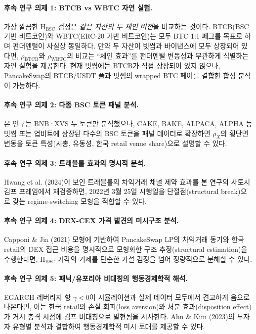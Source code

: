 \documentclass[11pt,a4paper]{article}
\begin{document}
\paragraph{후속 연구 의제 1: BTCB vs WBTC 자연 실험.}
가장 깔끔한 H$_{\text{BSC}}$ 검정은 \emph{같은 자산의 두 체인 버전}을 비교하는 것이다.
BTCB(BSC 기반 비트코인)와 WBTC(ERC-20 기반 비트코인)는 모두 BTC 1:1 페그를 목표로 하며
펀더멘털이 사실상 동일하다. 만약 두 자산이 빗썸과 바이낸스에 모두 상장되어 있다면,
$\rho_{\text{BTCB}}$와 $\rho_{\text{WBTC}}$의 비교는 ``체인 효과''를 펀더멘털 변동성과 무관하게
식별하는 자연 실험을 제공한다. 현재 빗썸에는 BTCB가 직접 상장되어 있지 않으나,
PancakeSwap의 BTCB/USDT 풀과 빗썸의 wrapped BTC 페어를 결합한 합성 분석이 가능하다.

\paragraph{후속 연구 의제 2: 다종 BSC 토큰 패널 분석.}
본 연구는 BNB·XVS 두 토큰만 분석했으나, CAKE, BAKE, ALPACA, ALPHA 등 빗썸 또는 업비트에 상장된
다수의 BSC 토큰을 패널 데이터로 확장하면 $\rho_X$의 횡단면 변동을 토큰 특성(시총, 유동성,
한국 retail venue share)으로 설명할 수 있다.

\paragraph{후속 연구 의제 3: 트래블룰 효과의 명시적 분석.}
Hwang et al. (2024)이 보인 트래블룰의 차익거래 채널 제약 효과를 본 연구의 사토시 김프
프레임에서 재검증하면, 2022년 3월 25일 시행일을 단절점(structural break)으로 갖는
regime-switching 모형을 적합할 수 있다.

\paragraph{후속 연구 의제 4: DEX-CEX 가격 발견의 미시구조 분석.}
Capponi \& Jia (2021) 모형에 기반하여 PancakeSwap LP의 차익거래 동기와 한국 retail의
DEX 접근 비용을 명시적으로 모형화한 구조 추정(structural estimation)을 수행한다면,
H$_{\text{BSC}}$ 기각의 기제를 단순한 가설 검정을 넘어 정량적으로 분해할 수 있다.

\paragraph{후속 연구 의제 5: 패닉/유포리아 비대칭의 행동경제학적 해석.}
EGARCH 레버리지 항 $\gamma<0$이 시뮬레이션과 실제 데이터 모두에서 견고하게 음으로 나온다면,
이는 한국 retail의 손실 회피(loss aversion)와 처분 효과(disposition effect)가 거시 충격 시점에
김프 비대칭으로 발현됨을 시사한다. Ahn \& Kim (2023)의 투자자 유형별 분석과 결합하여
행동경제학적 미시 토대를 제공할 수 있다.
\end{document}
